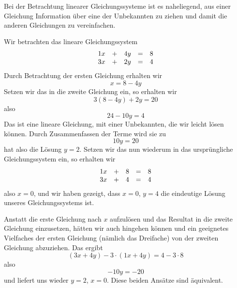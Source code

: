 Bei der Betrachtung linearer Gleichungssysteme ist es naheliegend, aus einer Gleichung Information über eine 
der Unbekannten zu ziehen und damit die anderen Gleichungen zu vereinfachen. 

\begin{beispiel}\label{gls_elem}  Wir betrachten das lineare Gleichungssystem
  $$ \begin{array} {l c l c l}
     1 x & + & 4 y & = & 8 \\
     3 x & + & 2 y & = & 4 
     \end{array} $$
Durch Betrachtung der ersten Gleichung erhalten wir 
  $$ x = 8  - 4 y $$
Setzen wir das in die zweite Gleichung ein, so erhalten wir
  $$ 3 ( 8 - 4 y) + 2 y = 20 $$
also 
  $$ 24 - 10 y =  4 $$
Das ist eine lineare Gleichung, mit einer Unbekannten, die wir leicht lösen können. Durch Zusammenfassen  der 
Terme wird sie zu  
  $$ 10 y = 20 $$
hat also die Lösung $y = 2$. Setzen wir das nun wiederum in das ursprüngliche Gleichungssystem ein, so erhalten 
wir 
  $$ \begin{array} {l c l c l}
     1 x & + & 8 & = & 8 \\
     3 x & + & 4 & = & 4 
     \end{array} $$
also $x = 0$, und wir haben gezeigt, dass $x = 0$, $y = 4$ die eindeutige Lösung unseres Gleichungssystems ist.

Anstatt die erste Gleichung nach $x$ aufzulösen und das Resultat in die zweite Gleichung einzusetzen, hätten 
wir auch hingehen können und ein geeignetes Vielfaches der ersten Gleichung (nämlich das Dreifache) von der 
zweiten Gleichung abzuziehen. Das ergibt
  $$ ( 3 x + 4 y) - 3 \cdot (1 x + 4 y ) = 4 - 3 \cdot 8 $$
also
  $$ - 10 y = - 20 $$
und liefert uns wieder $y = 2$, $x = 0$.  Diese beiden Ansätze sind äquivalent.
\end{beispiel}


